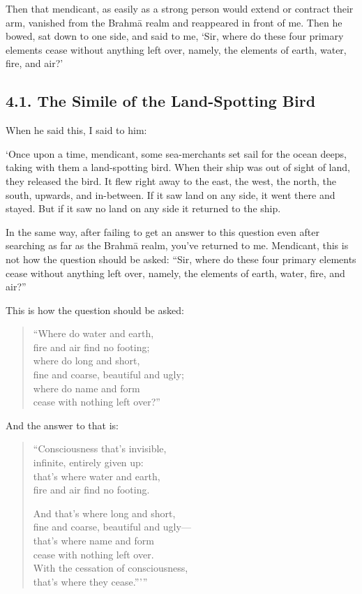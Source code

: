 \documentclass[12pt,openany]{book}%
\begin{document}
Then that mendicant, as easily as a strong person would extend or contract their arm, vanished from the \textsanskrit{Brahmā} realm and reappeared in front of me. Then he bowed, sat down to one side, and said to me, ‘Sir, where do these four primary elements cease without anything left over, namely, the elements of earth, water, fire, and air?’ 

\subsection*{4.1. The Simile of the Land-Spotting Bird }

When he said this, I said to him: 

‘Once upon a time, mendicant, some sea-merchants set sail for the ocean deeps, taking with them a land-spotting bird. When their ship was out of sight of land, they released the bird. It flew right away to the east, the west, the north, the south, upwards, and in-between. If it saw land on any side, it went there and stayed. But if it saw no land on any side it returned to the ship. 

In the same way, after failing to get an answer to this question even after searching as far as the \textsanskrit{Brahmā} realm, you’ve returned to me. Mendicant, this is not how the question should be asked: “Sir, where do these four primary elements cease without anything left over, namely, the elements of earth, water, fire, and air?” 

This is how the question should be asked: 

\begin{verse}%
“Where do water and earth, \\
fire and air find no footing; \\
where do long and short, \\
fine and coarse, beautiful and ugly; \\
where do name and form \\
cease with nothing left over?” 

%
\end{verse}

And the answer to that is: 

\begin{verse}%
“Consciousness that’s invisible, \\
infinite, entirely given up: \\
that’s where water and earth, \\
fire and air find no footing. 

And that’s where long and short, \\
fine and coarse, beautiful and ugly—\\
that’s where name and form \\
cease with nothing left over. \\
With the cessation of consciousness, \\
that’s where they cease.”’” 

%
\end{verse}
\end{document}
